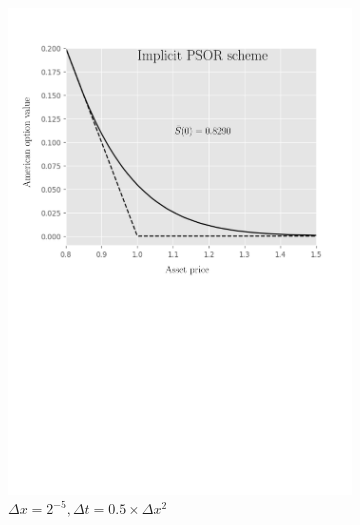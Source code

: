 \begin{figure}[H]
\begin{subfigure}{0.4\textwidth}
    \includegraphics[width=\textwidth]{chapters/chapter5/TestCase4ImplicitLCP.pdf}
    \caption{$\Delta{x}=2^{-5}, \Delta{t}=0.5\times\Delta{x}^2$}
    \label{fig:lcp:numericaresults:test_case_4_implicit}
  \end{subfigure}
  \hspace{0.5cm}
  \begin{subfigure}{0.4\textwidth}
    \label{fig:lcp:numericaresults:test_case_4_crank_nicholson}
    \centering

\end{subfigure}
\end{figure}
